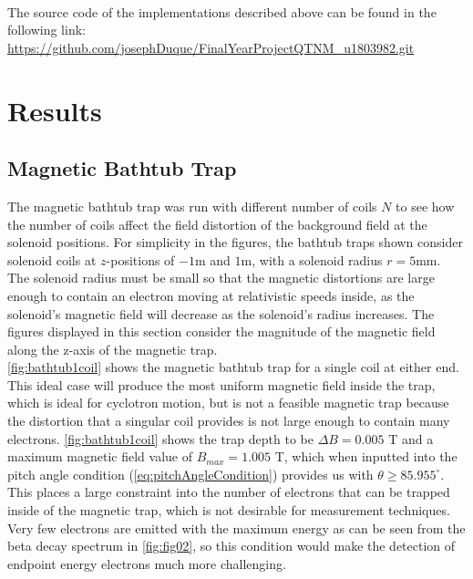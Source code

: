 \documentclass[a4paper,12pt, notitlepage]{article}
\begin{document}
\\
The source code of the implementations described above can be found in the following link: \url{https://github.com/josephDuque/FinalYearProjectQTNM_u1803982.git}
\section{Results}
\subsection{Magnetic Bathtub Trap}
The magnetic bathtub trap was run with different number of coils $N$ to see how the number of coils affect the field distortion of the background field at the solenoid positions. For simplicity in the figures, the bathtub traps shown consider solenoid coils at $z$-positions of $-1\textrm{m}$ and $1\textrm{m}$, with a solenoid radius $r=5\textrm{mm}$. The solenoid radius must be small so that the magnetic distortions are large enough to contain an electron moving at relativistic speeds inside, as the solenoid's magnetic field will decrease as the solenoid's radius increases. The figures displayed in this section consider the magnitude of the magnetic field along the z-axis of the magnetic trap. \\
\cref{fig:bathtub1coil} shows the magnetic bathtub trap for a single coil at either end. This ideal case will produce the most uniform magnetic field inside the trap, which is ideal for cyclotron motion, but is not a feasible magnetic trap because the distortion that a singular coil provides is not large enough to contain many electrons. \cref{fig:bathtub1coil} shows the trap depth to be $\Delta B=0.005$ T and a maximum magnetic field value of $B_{max}=1.005$ T, which when inputted into the pitch angle condition (\cref{eq:pitchAngleCondition}) provides us with $\theta \geq 85.955^{\circ}$. This places a large constraint into the number of electrons that can be trapped inside of the magnetic trap, which is not desirable for measurement techniques. Very few electrons are emitted with the maximum energy as can be seen from the beta decay spectrum in \cref{fig:fig02}, so this condition would make the detection of endpoint energy electrons much more challenging.
\end{document}
